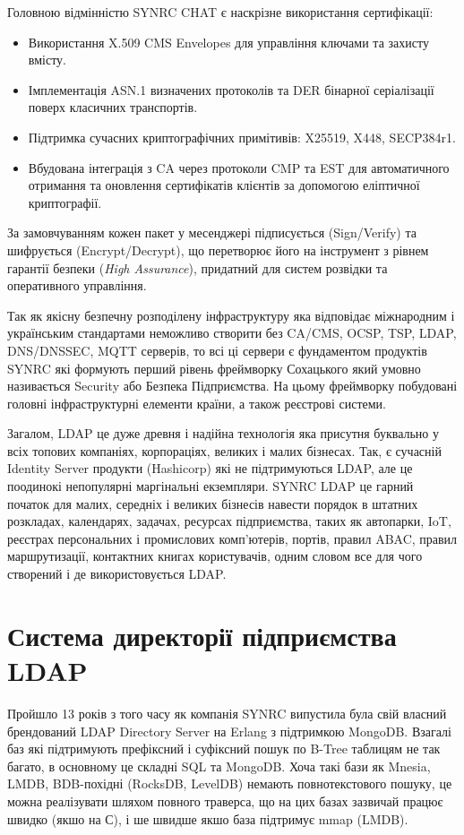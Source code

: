 Головною відмінністю SYNRC CHAT є наскрізне використання сертифікації:
\begin{itemize}
    \item Використання X.509 CMS Envelopes для управління ключами та захисту вмісту.
    \item Імплементація ASN.1 визначених протоколів та DER бінарної серіалізації поверх класичних транспортів.
    \item Підтримка сучасних криптографічних примітивів: X25519, X448, SECP384r1.
    \item Вбудована інтеграція з CA через протоколи CMP та EST для автоматичного отримання та оновлення сертифікатів клієнтів за допомогою еліптичної криптографії.
\end{itemize}
За замовчуванням кожен пакет у месенджері підписується (Sign/Verify) та шифрується (Encrypt/Decrypt), що перетворює його на інструмент з рівнем гарантії безпеки (\emph{High Assurance}), придатний для систем розвідки та оперативного управління.

Так як якісну безпечну розподілену інфраструктуру яка відповідає міжнародним і українським стандартами неможливо створити без CA/CMS, OCSP, TSP, LDAP, DNS/DNSSEC, MQTT серверів, то всі ці сервери є фундаментом продуктів SYNRC які формують перший рівень фреймворку Сохацького який умовно називається Security або Безпека Підприємства. На цьому фреймворку побудовані головні інфраструктурні елементи країни, а також реєстрові системи.

Загалом, LDAP це дуже древня і надійна технологія яка присутня буквально у всіх топових компаніях, корпораціях, великих і малих бізнесах. Так, є сучасній Identity Server продукти (Hashicorp) які не підтримуються LDAP, але це поодинокі непопулярні маргінальні екземпляри. SYNRC LDAP це гарний початок для малих, середніх і великих бізнесів навести порядок в штатних розкладах, календарях, задачах, ресурсах підприємства, таких як автопарки, IoT, реєстрах персональних і промислових комп'ютерів, портів, правил ABAC, правил маршрутизації, контактних книгах користувачів, одним словом все для чого створений і де використовується LDAP.

\section{Система директорії підприємства LDAP}

Пройшло 13 років з того часу як компанія SYNRC випустила була свій власний брендований LDAP Directory Server на Erlang з підтримкою MongoDB. Взагалі баз які підтримують префіксний і суфіксний пошук по B-Tree таблицям не так багато, в основному це складні SQL та MongoDB. Хоча такі бази як Mnesia, LMDB, BDB-похідні (RocksDB, LevelDB) немають повнотекстового пошуку, це можна реалізувати шляхом повного траверса, що на цих базах зазвичай працює швидко (якшо на С), і ше швидше якшо база підтримує mmap (LMDB).

